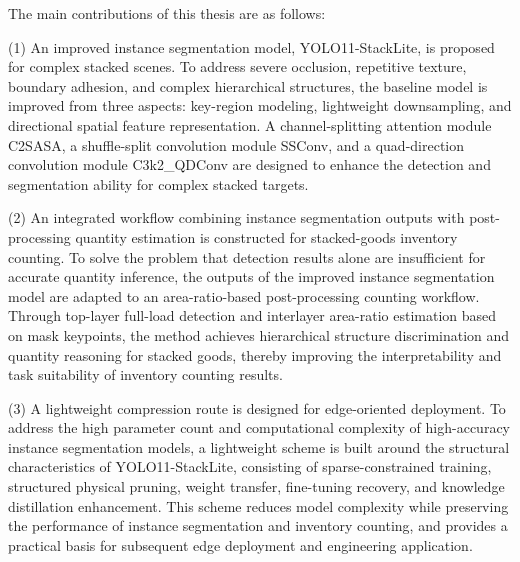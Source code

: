 \begin{abstract*}
The main contributions of this thesis are as follows:

(1) An improved instance segmentation model, YOLO11-StackLite, is proposed for complex stacked scenes. To address severe occlusion, repetitive texture, boundary adhesion, and complex hierarchical structures, the baseline model is improved from three aspects: key-region modeling, lightweight downsampling, and directional spatial feature representation. A channel-splitting attention module C2SASA, a shuffle-split convolution module SSConv, and a quad-direction convolution module C3k2\_QDConv are designed to enhance the detection and segmentation ability for complex stacked targets.

(2) An integrated workflow combining instance segmentation outputs with post-processing quantity estimation is constructed for stacked-goods inventory counting. To solve the problem that detection results alone are insufficient for accurate quantity inference, the outputs of the improved instance segmentation model are adapted to an area-ratio-based post-processing counting workflow. Through top-layer full-load detection and interlayer area-ratio estimation based on mask keypoints, the method achieves hierarchical structure discrimination and quantity reasoning for stacked goods, thereby improving the interpretability and task suitability of inventory counting results.

(3) A lightweight compression route is designed for edge-oriented deployment. To address the high parameter count and computational complexity of high-accuracy instance segmentation models, a lightweight scheme is built around the structural characteristics of YOLO11-StackLite, consisting of sparse-constrained training, structured physical pruning, weight transfer, fine-tuning recovery, and knowledge distillation enhancement. This scheme reduces model complexity while preserving the performance of instance segmentation and inventory counting, and provides a practical basis for subsequent edge deployment and engineering application.
\end{abstract*}
